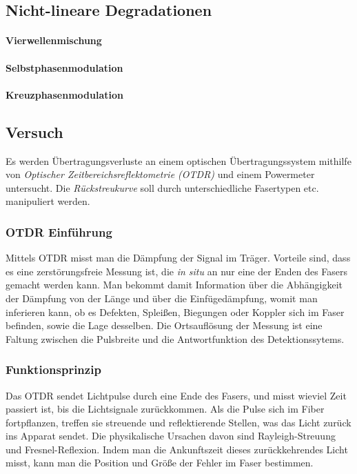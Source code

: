 \documentclass[a4paper]{article}
\begin{document}
\subsection{Nicht-lineare Degradationen}
\paragraph{Vierwellenmischung}
\paragraph{Selbstphasenmodulation}
\paragraph{Kreuzphasenmodulation}

\subsection{Versuch}
Es werden Übertragungsverluste an einem optischen Übertragungssystem
mithilfe von \emph{Optischer Zeitbereichsreflektometrie (OTDR)} und
einem Powermeter untersucht.
Die \emph{Rückstreukurve} soll durch unterschiedliche Fasertypen etc.
manipuliert werden.

\subsubsection{OTDR Einführung}
Mittels OTDR misst man die Dämpfung der Signal im Träger. Vorteile sind, dass
es eine zerstörungsfreie Messung ist, die \emph{in situ} an nur eine der Enden
des Fasers gemacht werden kann. Man bekommt damit Information über die
Abhängigkeit der Dämpfung von der Länge und über die Einfügedämpfung, womit man
inferieren kann, ob es Defekten, Spleißen, Biegungen oder Koppler sich im Faser
befinden, sowie die Lage desselben. Die Ortsauflösung der Messung ist eine
Faltung zwischen die Pulsbreite und die Antwortfunktion des Detektionssytems.  

\subsubsection{Funktionsprinzip} 
Das OTDR sendet Lichtpulse durch eine Ende des Fasers, und misst wieviel Zeit
passiert ist, bis die Lichtsignale zurückkommen.  Als die Pulse sich im Fiber
fortpflanzen, treffen sie streuende und reflektierende Stellen, was das Licht
zurück ins Apparat sendet. Die physikalische Ursachen davon sind
Rayleigh-Streuung und Fresnel-Reflexion.  Indem man die Ankunftszeit dieses
zurückkehrendes Licht misst, kann man die Position und Größe der Fehler im
Faser bestimmen.
\end{document}

